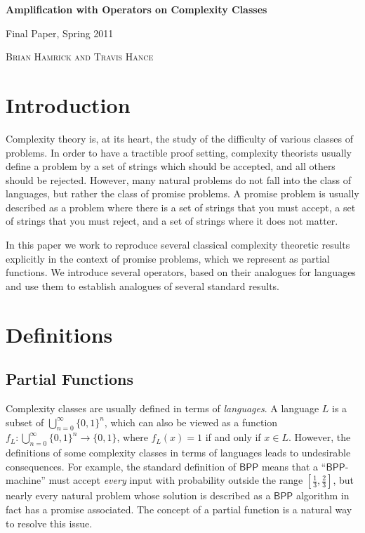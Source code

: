 \documentclass[11pt]{article}
\newcommand{\bpp}{\textsf{BPP}}
\begin{document}
\begin{center} \begin{LARGE} {\sc \bf Amplification with Operators on Complexity Classes} \vspace{6pt}

{ Final Paper, Spring 2011} \vspace{9pt}

\end{LARGE} { \Large \textsc{Brian Hamrick and Travis Hance}}

\end{center}

\section{Introduction}

Complexity theory is, at its heart, the study of the difficulty of various classes of problems. In order to have a tractible proof setting, complexity theorists usually define a problem by a set of strings which should be accepted, and all others should be rejected. However, many natural problems do not fall into the class of languages, but rather the class of promise problems. A promise problem is usually described as a problem where there is a set of strings that you must accept, a set of strings that you must reject, and a set of strings where it does not matter.

In this paper we work to reproduce several classical complexity theoretic results explicitly in the context of promise problems, which we represent as partial functions. We introduce several operators, based on their analogues for languages and use them to establish analogues of several standard results.

\section{Definitions}

\subsection{Partial Functions}

Complexity classes are usually defined in terms of \emph{languages}. A language $L$ is a subset of $\bigcup_{n=0}^{\infty}\{0,1\}^n$, which can also be viewed as a function $f_L: \bigcup_{n=0}^{\infty}\{0,1\}^n \to \{0,1\}$, where $f_L(x) = 1$ if and only if $x \in L$. However, the definitions of some complexity classes in terms of languages leads to undesirable consequences. For example, the standard definition of $\bpp$ means that a ``$\bpp$-machine'' must accept \emph{every} input with probability outside the range $[\frac{1}{3},\frac{2}{3}]$, but nearly every natural problem whose solution is described as a $\bpp$ algorithm in fact has a promise associated. The concept of a partial function is a natural way to resolve this issue.
\end{document}
